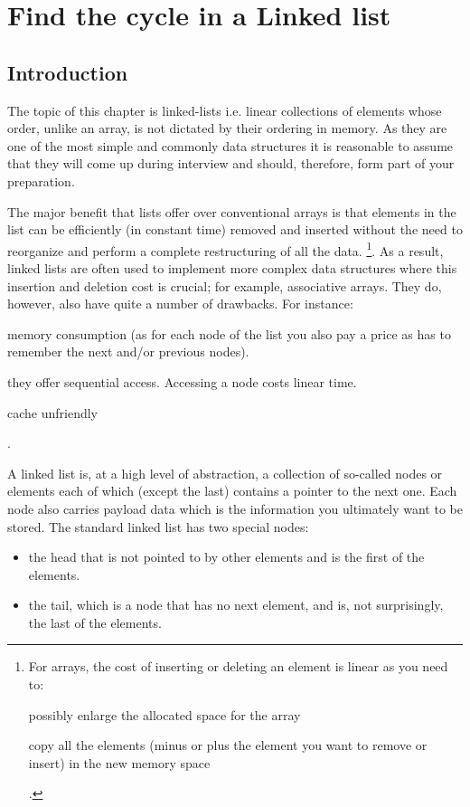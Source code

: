 %

\chapter{Find the cycle in a Linked list}
\label{ch:cycle_in_list}
\section*{Introduction}
The topic of this chapter is linked-lists i.e. linear collections of elements whose order, unlike an array,
is not dictated by their ordering in memory. 
As they are one of the most simple and commonly data structures it is reasonable to assume that they will come up during interview and should, therefore, form part of your preparation.

The major benefit that lists offer over conventional arrays is that elements in the list can be efficiently  (in constant time) 
removed and inserted without the need to reorganize and perform a complete restructuring of all the data.  \footnote{For arrays, the cost of inserting or deleting an element is linear as you need to:
\begin{enumerate*}
	\item possibly enlarge the allocated space for the array
	\item copy all the elements (minus or plus the element you want to remove or insert) in the new memory space
\end{enumerate*}.
}. As a result, linked lists are often used to implement more complex data structures 
where this insertion and deletion cost is crucial; for example, associative arrays.
They do,  however, also have quite a number of drawbacks. For instance: 
\begin{enumerate*}
	\item memory consumption (as for each node of the list you also pay a price as has to remember the next and/or previous nodes).
	\item they offer sequential access. Accessing a node costs linear time.
	\item cache unfriendly
\end{enumerate*}. 

A linked list is, at a high level of abstraction, a collection of so-called nodes or elements each of which (except the last) contains
a pointer to the next one. 
Each node also carries payload data which is the information you ultimately want to be stored.
The standard linked list has two special nodes:
\begin{itemize}
	\item the head that is not pointed to by other elements and is the first of the elements. 
	\item the tail, which is a node that has no next element, and is, not surprisingly, the last of the elements.
\end{itemize}

